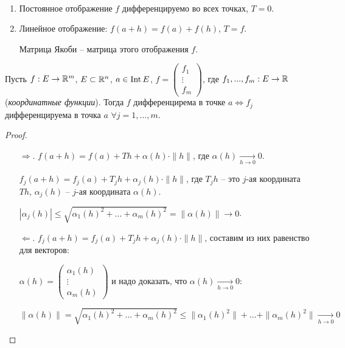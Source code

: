 \begin{example}~
    \begin{enumerate}
        \item Постоянное отображение $f$ дифференцируемо во всех точках, $T=0$.
        \item Линейное отображение: $f(a+h)=f(a)+f(h)$, $T=f$.

        Матрица Якоби – матрица этого отображения $f$.
    \end{enumerate}
\end{example}

\begin{theorem}
    Пусть $f: E\rightarrow \mathbb{R}^m$, $E\subset \mathbb{R}^n$, $a\in \operatorname{Int} E$, $f=\begin{pmatrix}
        f_1  \\ \vdots \\ f_m
    \end{pmatrix}$, где $f_1, ..., f_m: E\rightarrow \mathbb{R}$ (\textit{координатные функции}). Тогда $f$ дифференцирема в точке $a\Leftrightarrow f_j$  дифференцируема в точка $a$ $\forall j=1, ..., m$.
\end{theorem}

\begin{proof}~
    \begin{enumerate}
        \item[$\Rightarrow$.] $f(a+h)=f(a) + Th + \alpha (h)\cdot \|h\|$, где $\alpha(h)\underset{h\rightarrow 0}{\rightarrow}0$.

         $f_j(a+h)=f_j(a) + T_jh + \alpha_j (h)\cdot \|h\|$, где $T_jh$ – это $j$-ая координата $Th$, $\alpha_j(h)$ – $j$-ая координата $\alpha(h)$.

         $|\alpha_j(h)|\leq \sqrt{\alpha_1(h)^2+...+\alpha_m(h)^2}=\|\alpha(h)\|\rightarrow 0$.

         \item[$\Leftarrow$.] $f_j(a+h)=f_j(a) + T_jh + \alpha_j (h)\cdot \|h\|$, составим из них равенство для векторов:

         $\alpha(h)=\begin{pmatrix}
             \alpha_1(h) \\ \vdots \\ \alpha_m(h)
         \end{pmatrix}$ и надо доказать, что $\alpha (h) \underset{h\rightarrow 0}{\rightarrow}0$: 
         
         $\|\alpha(h)\|= \sqrt{\alpha_1(h)^2+...+\alpha_m(h)^2}\leq \|\alpha_1(h)^2\|+...+\|\alpha_m(h)^2\| \underset{h\rightarrow 0}{\rightarrow}0$
    \end{enumerate}
\end{proof}

